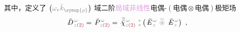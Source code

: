 其中，定义了 $\left( \mathcolor{gray}{\omega}, \mathcolor{gray}{\bar{k}_{\symup{\rho}}} \right)$ 域二阶\textcolor{Plum}{局域}\textcolor{Plum}{非线性}\textcolor{NavyBlue}{电偶-$(\text{电偶}\otimes\text{电偶})$}极矩场
\begin{align} \label{eq:vec-DP^(2)-p_pp}
	\Xint{\mathcolor{gray}{-}}{30}{\bar{D}}^{\;\! \mathcolor{gray}{\omega}}_{\;\! \mathcolor{gray}{z} \textcolor{Maroon}{(2)}} &= \Xint{\mathcolor{gray}{-}}{30}{\bar{P}}^{\;\! \mathcolor{gray}{\omega}}_{\;\! \mathcolor{gray}{z} \textcolor{Maroon}{(2)}} = \Xint{{}^{}_{\mathcolor{gray}{-}}}{23}{\bar{\bar{\bar{\chi}}}}^{\;\! \mathcolor{gray}{\omega}}_{\mathcolor{gray}{z} \textcolor{Maroon}{(2)}} ~{}^{\mathcolor{gray}{*}}_{\mathcolor{gray}{*}} \left( \Xint{\mathcolor{gray}{-}}{295}{\bar{E}}^{\;\!\mathcolor{gray}{\omega}}_{\;\! \mathcolor{gray}{z}} ~\mathcolor{gray}{\widetilde \circledast}~ \Xint{\mathcolor{gray}{-}}{295}{\bar{E}}^{\;\!\mathcolor{gray}{\omega}}_{\;\! \mathcolor{gray}{z}} \right) ~,
\end{align}

